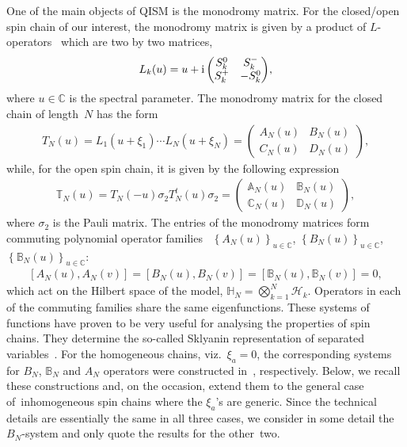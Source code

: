 One of the main objects of QISM is the monodromy matrix. For the closed/open spin chain of our interest, the monodromy matrix is given by a
product of $L$-operators~\cite{Faddeev:1979gh} which are two by two matrices,
\begin{gather*}
L_k(u)=u+{\rm i}
\begin{pmatrix}
S^0_k& S^-_k\\
S^+_k &-S_k^0
\end{pmatrix}\!,
\end{gather*}
where $u\in \mathbb C$ is the spectral parameter. The monodromy matrix for the closed chain of length~$N$ has the
form~\cite{Faddeev:1979gh}
\begin{gather*}%
T_N(u) =L_1(u+\xi_1)\cdots L_N(u+\xi_N)=\begin{pmatrix}
A_N(u)& B_N(u)\\
C_N(u) & D_N(u)
\end{pmatrix}\!,
\end{gather*}
while, for the open spin chain, it is given by the following expression~\cite{MR953215}
\begin{gather}\label{Topen}
\mathbb{T}_N(u) = T_N(-u) \sigma_2 T_N^{t} (u)\sigma_2 = \begin{pmatrix}
\mathbb{A}_N(u) & \mathbb{B}_N(u)\\
\mathbb{C}_N(u) & \mathbb{D}_N(u)
\end{pmatrix}\!,
\end{gather}
where $\sigma_2$ is the Pauli matrix. The entries of the monodromy matrices form commuting polynomial operator families~\cite{MR953215,Faddeev:1979gh} $\left\{A_N(u)\right\}_{u \in \mathbb{C} }$,
$\left\{B_N(u)\right\}_{u \in \mathbb{C}}$, $\left\{\mathbb{B}_N(u)\right\}_{u \in \mathbb{C}}$:
\begin{gather*}
 \left[A_N(u),A_N(v)\right]=\left[B_N(u),B_N(v)\right]=\left[\mathbb B_N(u),\mathbb B_N(v)\right]=0,
\end{gather*}
which act on the Hilbert space of the model, $\mathbb H_N=\bigotimes_{k=1}^N \mathcal H_k$. Operators in each of the commuting families
share the same eigenfunctions. These systems of functions have proven to be very useful for analysing the properties of spin chains.
They determine the so-called Sklyanin representation of separated variables~\cite{MR1239668}. For the homogeneous chains, viz.~$\xi_a=0$, the corresponding systems for $B_N$, $\mathbb B_N$ and $A_N$ operators were constructed in~\cite{Belitsky:2014rba,Derkachov:2003qb,Derkachov:2002tf}, respectively. Below, we recall these constructions and, on the occasion,
extend them to the general case of~inho\-mo\-ge\-neous spin chains where the $\xi_a$'s are generic. Since the technical details are essentially
the same in all three cases, we consider in some detail the $B_N$-system and only quote the results for the other~two.

